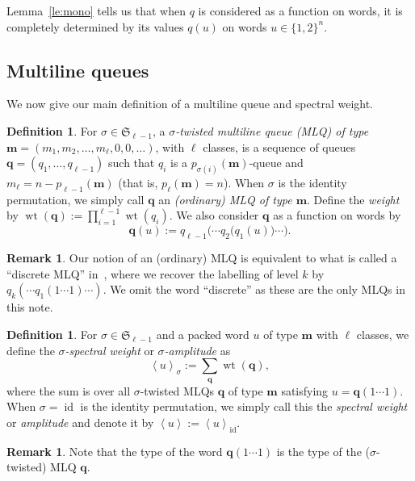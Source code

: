 \documentclass[reqno]{amsart}
\newcommand{\0}{\phantom{c}}
\newcommand{\swt}[1]{\left\langle #1 \right\rangle} %
\newcommand{\SymGp}[1]{\mathfrak{S}_{#1}} %
\DeclareMathOperator{\wt}{wt} %
\DeclareMathOperator{\id}{id} %
\newcommand{\mm}{\mathbf{m}}
\newcommand{\qq}{\mathbf{q}}
\let\sumnonlimits\sum
\let\prodnonlimits\prod
\renewcommand{\sum}{\sumnonlimits\limits}
\renewcommand{\prod}{\prodnonlimits\limits}
\newcommand{\tup}[1]{\left( #1 \right)}
\newcommand{\defn}[1]{{\color{darkred}\emph{#1}}} %
\theoremstyle{plain}
\theoremstyle{definition}
\newtheorem{dfn}[thm]{Definition}
\newtheorem{remark}[thm]{Remark}
\numberwithin{equation}{section}
\begin{document}
Lemma~\ref{le:mono} tells us that when $q$ is considered as a function on words, it is completely determined by its values $q(u)$ on words $u \in \{1,2\}^n$.


\subsection{Multiline queues}

We now give our main definition of a multiline queue and spectral weight.

\begin{dfn}
For $\sigma \in \SymGp{\ell-1}$, a \defn{$\sigma$-twisted multiline queue (MLQ) of type $\mm = \tup{m_1, m_2, \ldots, m_\ell, 0, 0, \ldots}$}, with $\ell$ classes, is a sequence of queues $\qq = (q_1, \dotsc, q_{\ell-1})$ such that $q_i$ is a $p_{\sigma(i)}(\mm)$-queue and $m_{\ell} = n - p_{\ell-1}(\mm)$ (that is, $p_\ell(\mm) = n$).
When $\sigma$ is the identity permutation, we simply call $\qq$ an \defn{(ordinary) MLQ of type $\mm$}.
Define the \defn{weight} by $\wt(\qq) := \prod_{i=1}^{\ell-1} \wt(q_i)$.
We also consider $\qq$ as a function on words by
\[
\qq(u) := q_{\ell-1}\bigl( \cdots q_2\bigl( q_1(u) \bigr) \cdots \bigr).
\]
\end{dfn}

\begin{remark}
Our notion of an (ordinary) MLQ is equivalent to what is called a ``discrete MLQ'' in~\cite[\S 2.2]{AasLin17}, where we recover the labelling of level $k$ by $q_k( \cdots q_1(1 \dotsm 1) \cdots )$.
We omit the word ``discrete'' as these are the only MLQs in this note.
\end{remark}

\begin{dfn}
For $\sigma \in \SymGp{\ell-1}$ and a packed word $u$ of type $\mm$ with $\ell$ classes, we define the \defn{$\sigma$-spectral weight} or \defn{$\sigma$-amplitude} as
\begin{equation}
\label{eq:amplitude}
  \swt{u}_{\sigma} := \sum_{\qq} \wt(\qq),
\end{equation}
where the sum is over all $\sigma$-twisted MLQs $\qq$ of type $\mm$ satisfying $u = \qq(1 \dotsm 1)$.
When $\sigma = \id$ is the identity permutation, we simply call this the \defn{spectral weight} or \defn{amplitude} and denote it by $\swt{u} := \swt{u}_{\id}$.
\end{dfn}

\begin{remark}
Note that the type of the word $\qq(1 \dotsm 1)$ is the type of the ($\sigma$-twisted) MLQ $\qq$.
\end{remark}
\end{document}
